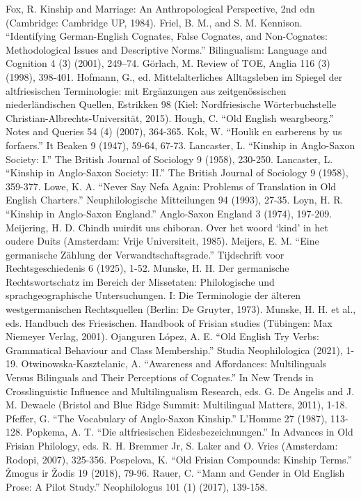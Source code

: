 Fox, R. Kinship and Marriage: An Anthropological Perspective, 2nd edn (Cambridge: Cambridge UP, 1984).
Friel, B. M., and S. M. Kennison. “Identifying German-English Cognates, False Cognates, and Non-Cognates: Methodological Issues and Descriptive Norms.” Bilingualism: Language and Cognition 4 (3) (2001), 249–74.
Görlach, M. Review of TOE, Anglia 116 (3) (1998), 398-401.
Hofmann, G., ed. Mittelalterliches Alltagsleben im Spiegel der altfriesischen Terminologie: mit Ergänzungen aus zeitgenössischen niederländischen Quellen, Estrikken 98 (Kiel: Nordfriesische Wörterbuchstelle Christian-Albrechts-Universität, 2015).
Hough, C. “Old English weargbeorg.” Notes and Queries 54 (4) (2007), 364-365.
Kok, W. “Houlik en earberens by us forfaers.” It Beaken 9 (1947), 59-64, 67-73.
Lancaster, L. “Kinship in Anglo-Saxon Society: I.” The British Journal of Sociology 9 (1958), 230-250.
Lancaster, L. “Kinship in Anglo-Saxon Society: II.” The British Journal of Sociology 9 (1958), 359-377.
Lowe, K. A. “Never Say Nefa Again: Problems of Translation in Old English Charters.” Neuphilologische Mitteilungen 94 (1993), 27-35.
Loyn, H. R. “Kinship in Anglo-Saxon England.” Anglo-Saxon England 3 (1974), 197-209.
Meijering, H. D. Chindh uuirdit uns chiboran. Over het woord ‘kind’ in het oudere Duits (Amsterdam: Vrije Universiteit, 1985).
Meijers, E. M. “Eine germanische Zählung der Verwandtschaftsgrade.” Tijdschrift voor Rechtsgeschiedenis 6 (1925), 1-52.
Munske, H. H. Der germanische Rechtswortschatz im Bereich der Missetaten: Philologische und sprachgeographische Untersuchungen. I: Die Terminologie der älteren westgermanischen Rechtsquellen (Berlin: De Gruyter, 1973).
Munske, H. H. et al., eds. Handbuch des Friesischen. Handbook of Frisian studies (Tübingen: Max Niemeyer Verlag, 2001).
Ojanguren López, A. E. “Old English Try Verbs: Grammatical Behaviour and Class Membership.” Studia Neophilologica (2021), 1-19.
Otwinowska-Kasztelanic, A. “Awareness and Affordances: Multilinguals Versus Bilinguals and Their Perceptions of Cognates.” In New Trends in Crosslinguistic Influence and Multilingualism Research, eds. G. De Angelis and J. M. Dewaele (Bristol and Blue Ridge Summit: Multilingual Matters, 2011), 1-18.
Pfeffer, G. “The Vocabulary of Anglo-Saxon Kinship.” L’Homme 27 (1987), 113-128.
Popkema, A. T. “Die altfriesischen Eidesbezeichnungen.” In Advances in Old Frisian Philology, eds. R. H. Bremmer Jr, S. Laker and O. Vries (Amsterdam: Rodopi, 2007), 325-356.
Pospelova, K. “Old Frisian Compounds: Kinship Terms.” Žmogus ir Žodis 19 (2018), 79-96.
Rauer, C. “Mann and Gender in Old English Prose: A Pilot Study.” Neophilologus 101 (1) (2017), 139-158.
